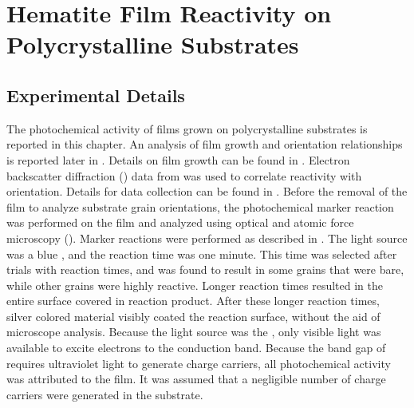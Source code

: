 

\chapter{Hematite Film Reactivity on Polycrystalline Substrates}
\label{ch:polycrystalline.reactivity}




\section{Experimental Details}
\label{sec:poly.reac.experimental}


The photochemical activity of  films grown on polycrystalline 
substrates is reported in this chapter. An analysis of film growth and orientation
relationships is reported later in . Details on film
growth can be found in . Electron backscatter
diffraction () data from  was used to correlate
reactivity with orientation. Details for data collection can be found in
. Before the removal of the film to analyze
substrate grain orientations, the photochemical marker reaction was performed on the film
and analyzed using optical and atomic force microscopy (). Marker reactions were
performed as described in . The light source
was a blue , and the reaction time was one minute. This time was selected after
trials with reaction times, and was found to result in some grains that were bare, while
other grains were highly reactive. Longer reaction times resulted in the entire surface
covered in reaction product. After these longer reaction times, silver colored material
visibly coated the reaction surface, without the aid of microscope analysis. Because the
light source was the , only visible light was available to excite electrons to
the conduction band. Because the band gap of  requires ultraviolet light to
generate charge carriers, all photochemical activity was attributed to the film. It was
assumed that a negligible number of charge carriers were generated in the substrate.

